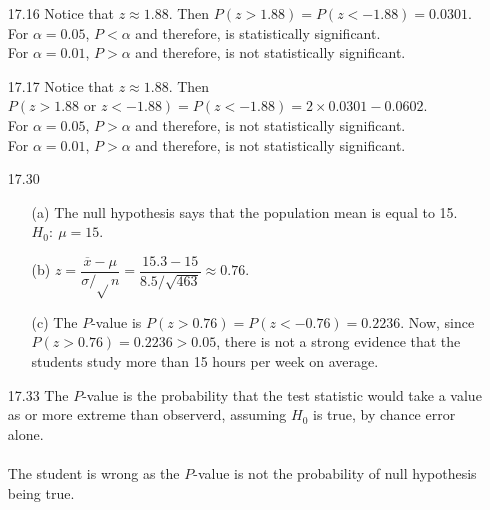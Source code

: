 \documentclass[11pt, a4paper]{article}
\begin{document}
\begin{itemize}
\item[17.16]
Notice that $z \approx 1.88$. Then $P(z > 1.88) = P(z < -1.88) = 0.0301$.\\
For $\alpha = 0.05$, $P < \alpha$ and therefore, is statistically significant.\\
For $\alpha = 0.01$, $P > \alpha$ and therefore, is not statistically significant.

\item[]
\item[]

\item[17.17]
Notice that $z \approx 1.88$. Then $P(z > 1.88 \text{ or } z < -1.88) = P(z < -1.88) = 2 \times 0.0301 - 0.0602$.\\
For $\alpha = 0.05$, $P > \alpha$ and therefore, is not statistically significant.\\
For $\alpha = 0.01$, $P > \alpha$ and therefore, is not statistically significant.

\item[17.30]
\begin{itemize}
\item[(a)]
The null hypothesis says that the population mean is equal to 15.
$H_0: \ \mu = 15$.

\item[]

\item[(b)]
$z = \displaystyle\dfrac{\overline{x} - \mu}{\sigma/\sqrt{}n} = \displaystyle\dfrac{15.3 - 15}{8.5/\sqrt{463}} \approx 0.76$.

\item[]

\item[(c)]
The $P$-value is $P(z > 0.76) = P(z < -0.76) = 0.2236$.
Now, since $P(z > 0.76) = 0.2236 > 0.05$, there is not
a strong evidence that the students study more than
15 hours per week on average.
\end{itemize}

\item[]
\item[]

\item[17.33]
The $P$-value is the probability that the test statistic
would take a value as or more extreme than observerd, assuming
$H_0$ is true, by chance error alone.\\\\
The student is wrong as the $P$-value is not the probability
of null hypothesis being true.

\item[]
\item[]


\end{itemize}
\end{document}
